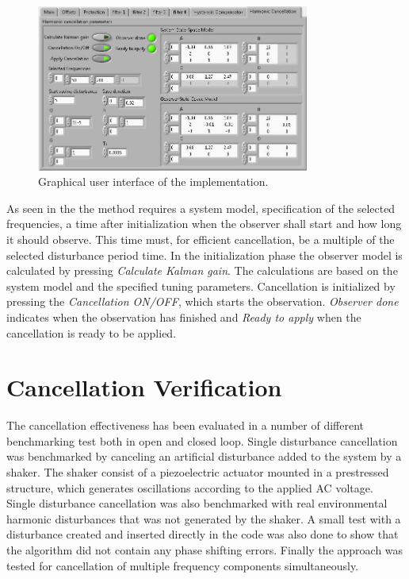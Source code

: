 \begin{figure}[h]
  \centering %
  \includegraphics[width=0.8\textwidth]{fig/HC_gui}
  \caption{\label{fig:gui}Graphical user interface of the \abbrRFDC implementation.}
\end{figure}

As seen in the \abbrGUI the method requires a system model, specification of the selected frequencies, a time after initialization when the observer shall start and how long it should observe. This time must, for efficient cancellation, be a multiple of the selected disturbance period time. In the initialization phase the observer model is calculated by pressing \emph{Calculate Kalman gain}. The calculations are based on the system model and the specified tuning parameters. Cancellation is initialized by pressing the \emph{Cancellation ON/OFF}, which starts the observation. \emph{Observer done} indicates when the observation has finished and \emph{Ready to apply} when the cancellation is ready to be applied.

\section{Cancellation Verification}
The cancellation effectiveness has been evaluated in a number of different benchmarking test both in open and closed loop. Single disturbance cancellation was benchmarked by canceling an artificial disturbance added to the system by a shaker. The shaker consist of a piezoelectric actuator mounted in a prestressed structure, which generates oscillations according to the applied AC voltage. Single disturbance cancellation was also benchmarked with real environmental harmonic disturbances that was not generated by the shaker. A small test with a disturbance created and inserted directly in the code was also done to show that the algorithm did not contain any phase shifting errors. Finally the approach was tested for cancellation of multiple frequency components simultaneously.

